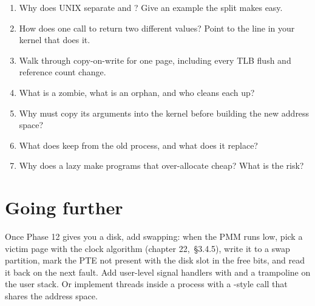 \documentclass[11pt,a4paper]{article}
\begin{document}
\begin{questionbox}
\begin{enumerate}
  \item Why does UNIX separate  and ? Give an example the split makes easy.
  \item How does one call to  return two different values? Point to the line in your kernel that does it.
  \item Walk through copy-on-write for one page, including every TLB flush and reference count change.
  \item What is a zombie, what is an orphan, and who cleans each up?
  \item Why must  copy its arguments into the kernel before building the new address space?
  \item What does  keep from the old process, and what does it replace?
  \item Why does a lazy  make programs that over-allocate cheap? What is the risk?
\end{enumerate}
\end{questionbox}

\section{Going further}

Once Phase 12 gives you a disk, add swapping: when the PMM runs low, pick a victim page with the clock algorithm
(\OSTEP chapter 22, \MOS\,\S3.4.5), write it to a swap partition, mark the PTE not present with the disk slot in the
free bits, and read it back on the next fault. Add user-level signal handlers with  and a
 trampoline on the user stack. Or implement threads inside a process with a -style call
that shares the address space.

\booklegend
\end{document}
